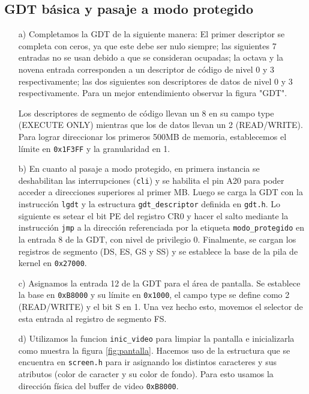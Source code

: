 \subsection{GDT básica y pasaje a modo protegido}

\begin{enumerate}

\item[a)] Completamos la GDT de la siguiente manera: El primer descriptor se completa con ceros, ya que este debe ser nulo siempre; las siguientes 7 entradas no se usan debido a que se consideran ocupadas; la octava y la novena entrada corresponden a un descriptor de código de nivel 0 y 3 respectivamente; las dos siguientes son descriptores de datos de nivel 0 y 3 respectivamente. Para un mejor entendimiento observar la figura "GDT".

Los descriptores de segmento de código llevan un 8 en su campo type (EXECUTE ONLY) mientras que los de datos llevan un 2 (READ/WRITE). Para lograr direccionar los primeros 500MB de memoria, establecemos el límite en {\tt 0x1F3FF} y la granularidad en 1.

\item[b)] En cuanto al pasaje a modo protegido, en primera instancia se deshabilitan las interrupciones ({\tt cli}) y se habilita el pin A20 para poder acceder a direcciones superiores al primer MB.  Luego se carga la GDT con la instrucci\'on {\tt lgdt} y la estructura {\tt gdt_descriptor} definida en {\tt gdt.h}. Lo siguiente es setear el bit PE del registro CR0 y hacer el salto mediante la instrucci\'on {\tt jmp} a la direcci\'on referenciada por la etiqueta {\tt modo_protegido} en la entrada 8 de la GDT, con nivel de privilegio 0.  Finalmente, se cargan los registros de segmento (DS, ES, GS y SS) y se establece la base de la pila de kernel en {\tt 0x27000}.

\item[c)] Asignamos la entrada 12 de la GDT para el área de pantalla. Se establece la base en {\tt 0xB8000} y su límite en {\tt 0x1000}, el campo type se define como 2 (READ/WRITE) y el bit S en 1. Una vez hecho esto, movemos el selector de esta entrada al registro de segmento FS.

\item[d)] Utilizamos la funcion {\tt inic_video} para limpiar la pantalla e inicializarla como muestra la figura \ref{fig:pantalla}. Hacemos uso de la estructura que se encuentra en {\tt screen.h} para ir asignando los distintos caracteres y sus atributos (color de caracter y su color de fondo). Para esto usamos la dirección física del buffer de video {\tt 0xB8000}.


\end{enumerate}
